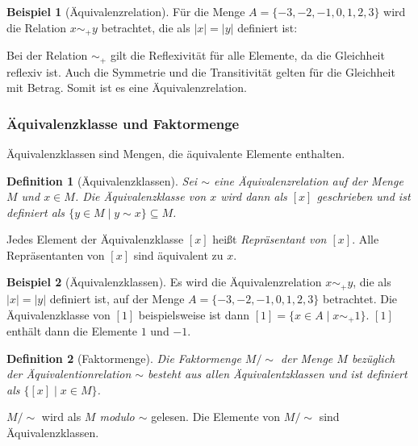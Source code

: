 \documentclass[12pt,a4paper, usenames, dvipsnames]{article}
\theoremstyle{mystyle}
\newtheorem{definition}{Definition}
\theoremstyle{definition}
\newtheorem{bsp}{Beispiel}[definition]
\begin{document}
\begin{bsp}[Äquivalenzrelation]
Für die Menge $A=\{ -3, -2, -1, 0, 1, 2, 3 \}$ wird die Relation $x \sim_+ y$ betrachtet, die als $|x| =|y|$ definiert ist:

Bei der Relation $\sim_+$ gilt die Reflexivität für alle Elemente, da die Gleichheit reflexiv ist. Auch die Symmetrie und die Transitivität gelten für die Gleichheit mit Betrag. Somit ist es eine Äquivalenzrelation. 


\end{bsp}

\subsubsection*{Äquivalenzklasse und Faktormenge} 
\label{Abschnitt_FaktormengenUndÄquivalenzklasse}

Äquivalenzklassen sind Mengen, die äquivalente Elemente enthalten.

\begin{definition}[Äquivalenzklassen]

Sei $ \sim $ eine Äquivalenzrelation auf der Menge $M$ und $x \in M$. Die Äquivalenzklasse von $x$ wird dann als $[x]$ geschrieben und ist definiert als $\{y \in M \mid y \sim x\} \subseteq M$.  

\end{definition}

Jedes Element der Äquivalenzklasse $[x]$ heißt \textit{Repräsentant von $[x]$}. Alle Repräsentanten von $[x]$ sind äquivalent zu $x$.

\begin{bsp}[Äquivalenzklassen]
Es wird die Äquivalenzrelation $x \sim_+ y$, die als $|x| =|y|$ definiert ist, auf der Menge $A=\{ -3, -2, -1, 0, 1, 2, 3 \}$ betrachtet. Die Äquivalenzklasse von $[1]$ beispielsweise ist dann $[1] = \{x \in A \mid x \sim_+ 1\}$. $[1]$ enthält dann die Elemente $1$ und $-1$.

\end{bsp}

\begin{definition}[Faktormenge]

Die Faktormenge $M / \sim $ der Menge $M$ bezüglich der Äquivalentionrelation $\sim$ besteht aus allen Äquivalentzklassen und ist definiert als $\{ [x] \mid x \in M \}$.

\end{definition}

$M / \sim $ wird als \textit{$M$ modulo $\sim$} gelesen. Die Elemente von $M / \sim $ sind Äquivalenzklassen.
\end{document}
